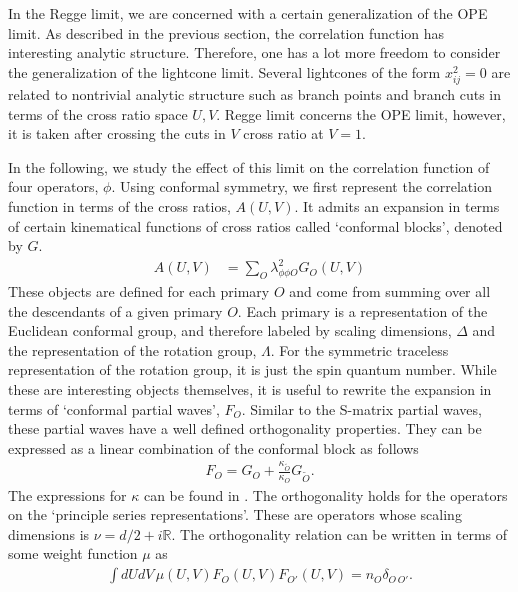 In the Regge limit, we are concerned with a certain generalization of the OPE limit.
As described in the previous section, the correlation function has interesting analytic structure.
Therefore, one has a lot more freedom to consider the generalization of the lightcone limit.
Several lightcones of the form $ x_{ij}^2 = 0 $ are related to nontrivial analytic structure such as branch points and branch cuts in terms of the cross ratio space $ U,V $.
Regge limit concerns the OPE limit, however, it is taken after crossing the cuts in $ V $ cross ratio at $ V = 1 $.

In the following, we study the effect of this limit on the correlation function of four operators, $ \phi $.
Using conformal symmetry, we first represent the correlation function in terms of the cross ratios, $ A\left( U,V \right) $.
It admits an expansion in terms of certain kinematical functions of cross ratios called `conformal blocks', denoted by $ G $.
\begin{align}
  A\left( U,V \right) & = \displaystyle\sum_{O} \lambda_{\phi \phi O}^2 G_{O}\left( U,V \right)
\end{align}
These objects are defined for each primary $ O $ and come from summing over all the descendants of a given primary $ O $.
Each primary is a representation of the Euclidean conformal group, and therefore labeled by scaling dimensions, $ \Delta $ and the representation of the rotation group, $ \Lambda $.
For the symmetric traceless representation of the rotation group, it is just the spin quantum number.
While these are interesting objects themselves, it is useful to rewrite the expansion in terms of `conformal partial waves', $ F_{O} $.
Similar to the S-matrix partial waves, these partial waves have a well defined orthogonality properties.
They can be expressed as a linear combination of the conformal block as follows
\begin{align}
  F_{O} = G_O + \frac{\kappa_{\tilde{O} }}{ \kappa_{O}} G_{\tilde{O}}
  .\end{align}
The expressions for $ \kappa $ can be found in \cite{Costa:2012cb}.
The orthogonality holds for the operators on the `principle series representations'.
These are operators whose scaling dimensions is $ \nu = d/2 + i \mathbb{R} $.
The orthogonality relation can be written in terms of some weight function $ \mu $ as \cite{Caron-Huot:2017vep}
\begin{align}
  \int dU dV \, \mu\left( U,V \right) F_{O}\left(U,V \right) F_{O'}\left(U,V \right) = n_{O} \delta_{O \, O'}
  .
\end{align}

